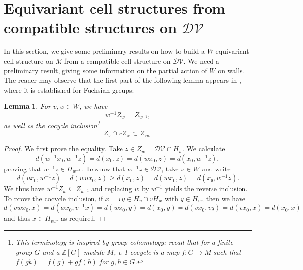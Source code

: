\documentclass[11pt,twoside]{amsart}
\theoremstyle{plain}
\newtheorem{lem}[prop]{Lemma}
\newcommand{\Z}{{\mathbb Z}}
\DeclareMathOperator\inj{inj}
\begin{document}











\section{Equivariant cell structures from compatible structures on $\mathcal{DV}$}

In this section, we give some preliminary results on how to build a $W$-equivariant cell structure on $M$ from a compatible cell structure on $\mathcal{DV}$. We need a preliminary result, giving some information on the partial action of $W$ on walls. The reader may observe that the first part of the following lemma appears in \cite[Corollary 1.4]{voigt_fundomfuchs}, where it is established for Fuchsian groups:
\begin{lem}\label{partactonwalls}
For $v,w\in W$, we have 
\[w^{-1}Z_w=Z_{w^{-1}},\]
as well as the \emph{cocycle inclusion}\footnote{This terminology is inspired by group cohomology: recall that for a finite group $G$ and a $\Z[G]$-module $M$, a 1-cocycle is a map $f : G\to M$ such that $f(gh)=f(g)+gf(h)$ for $g,h\in G$.}
\[Z_v\cap vZ_w\subset Z_{vw}.\]
\end{lem}
\begin{proof}
We first prove the equality. Take $z\in Z_w=\mathcal{DV}\cap H_w$. We calculate
\[d(w^{-1}x_0,w^{-1}z)=d(x_0,z)=d(wx_0,z)=d(x_0,w^{-1}z),\]
proving that $w^{-1}z\in H_{w^{-1}}$. To show that $w^{-1}z\in\mathcal{DV}$, take $u\in W$ and write
\[d(ux_0,w^{-1}z)=d(wux_0,z)\ge d(x_0,z)=d(wx_0,z)=d(x_0,w^{-1}z).\]
We thus have $w^{-1}Z_w\subseteq Z_{w^{-1}}$ and replacing $w$ by $w^{-1}$ yields the reverse inclusion. To prove the cocycle inclusion, if $x=vy\in H_v\cap vH_w$ with $y\in H_w$, then we have
\[d(vwx_0,x)=d(wx_0,v^{-1}x)=d(wx_0,y)=d(x_0,y)=d(vx_0,vy)=d(vx_0,x)=d(x_0,x)\]
and thus $x\in H_{vw}$, as required.
\end{proof}
\end{document}

